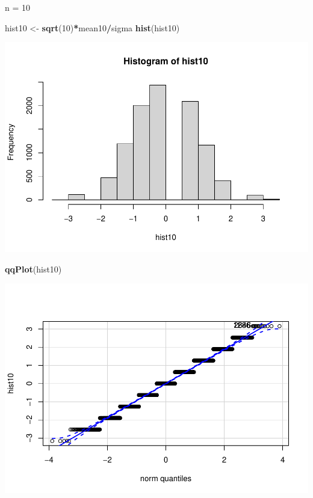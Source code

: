 \documentclass[
]{article}
\newenvironment{Shaded}{\begin{snugshade}}{\end{snugshade}}
\newcommand{\DecValTok}[1]{\textcolor[rgb]{0.00,0.00,0.81}{#1}}
\newcommand{\KeywordTok}[1]{\textcolor[rgb]{0.13,0.29,0.53}{\textbf{#1}}}
\newcommand{\NormalTok}[1]{#1}
\newcommand{\OperatorTok}[1]{\textcolor[rgb]{0.81,0.36,0.00}{\textbf{#1}}}
\newcommand{\StringTok}[1]{\textcolor[rgb]{0.31,0.60,0.02}{#1}}
\begin{document}
n = 10

\begin{Shaded}
\begin{Highlighting}[]
\NormalTok{hist10 <-}\StringTok{ }\KeywordTok{sqrt}\NormalTok{(}\DecValTok{10}\NormalTok{)}\OperatorTok{*}\NormalTok{mean10}\OperatorTok{/}\NormalTok{sigma}
\KeywordTok{hist}\NormalTok{(hist10)}
\end{Highlighting}
\end{Shaded}

\includegraphics{stad80a1_files/figure-latex/unnamed-chunk-11-1.pdf}

\begin{Shaded}
\begin{Highlighting}[]
\KeywordTok{qqPlot}\NormalTok{(hist10)}
\end{Highlighting}
\end{Shaded}

\includegraphics{stad80a1_files/figure-latex/unnamed-chunk-11-2.pdf}
\end{document}
